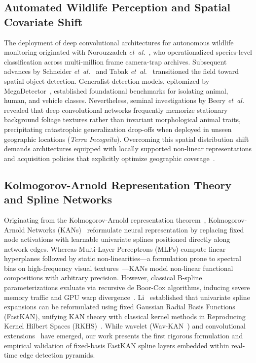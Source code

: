\documentclass[conference]{IEEEtran}
\begin{document}
\subsection{Automated Wildlife Perception and Spatial Covariate Shift}
The deployment of deep convolutional architectures for autonomous wildlife monitoring originated with Norouzzadeh \textit{et~al.}~\cite{norouzzadeh2018automatically}, who operationalized species-level classification across multi-million frame camera-trap archives. Subsequent advances by Schneider \textit{et~al.}~\cite{schneider2019three} and Tabak \textit{et~al.}~\cite{tabak2019machine} transitioned the field toward spatial object detection. Generalist detection models, epitomized by MegaDetector~\cite{beery2019efficient}, established foundational benchmarks for isolating animal, human, and vehicle classes. Nevertheless, seminal investigations by Beery \textit{et~al.}~\cite{beery2018recognition,beery2020iwildcam} revealed that deep convolutional networks frequently memorize stationary background foliage textures rather than invariant morphological animal traits, precipitating catastrophic generalization drop-offs when deployed in unseen geographic locations (\textit{Terra Incognita}). Overcoming this spatial distribution shift demands architectures equipped with locally supported non-linear representations and acquisition policies that explicitly optimize geographic coverage~\cite{tuia2022perspectives,kellenberger2018half,weinstein2018computer}.

\subsection{Kolmogorov-Arnold Representation Theory and Spline Networks}
Originating from the Kolmogorov-Arnold representation theorem~\cite{kolmogorov1957representation,arnold1957functions}, Kolmogorov-Arnold Networks (KANs)~\cite{liu2024kan} reformulate neural representation by replacing fixed node activations with learnable univariate splines positioned directly along network edges. Whereas Multi-Layer Perceptrons (MLPs) compute linear hyperplanes followed by static non-linearities---a formulation prone to spectral bias on high-frequency visual textures~\cite{rahaman2019spectral}---KANs model non-linear functional compositions with arbitrary precision. However, classical B-spline parameterizations evaluate via recursive de Boor-Cox algorithms, inducing severe memory traffic and GPU warp divergence~\cite{li2024fastkan,bodner2024convolutional}. Li~\cite{li2024fastkan} established that univariate spline expansions can be reformulated using fixed Gaussian Radial Basis Functions (FastKAN), unifying KAN theory with classical kernel methods in Reproducing Kernel Hilbert Spaces (RKHS)~\cite{broomhead1988multivariable,poggio1990networks}. While wavelet (Wav-KAN~\cite{bozorgasl2024wav}) and convolutional extensions~\cite{bodner2024convolutional} have emerged, our work presents the first rigorous formulation and empirical validation of fixed-basis FastKAN spline layers embedded within real-time edge detection pyramids.
\end{document}

